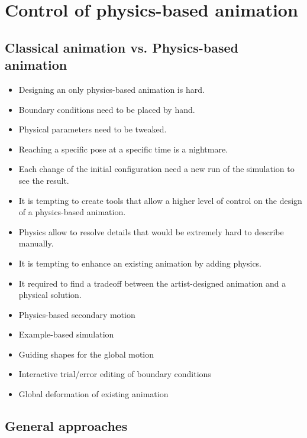 \section{Control of physics-based animation}

\subsection{Classical animation vs. Physics-based animation}

\begin{itemize}
\item Designing an only physics-based animation is hard.
\item Boundary conditions need to be placed by hand.
\item Physical parameters need to be tweaked.
\item Reaching a specific pose at a specific time is a nightmare.
\item Each change of the initial configuration need a new run of the simulation to see the result.
\item It is tempting to create tools that allow a higher level of control on the design of a physics-based animation.
\end{itemize}

\begin{itemize}
\item Physics allow to resolve details that would be extremely hard to describe manually.
\item It is tempting to enhance an existing animation by adding physics.
\item It required to find a tradeoff between the artist-designed animation and a physical solution.
\end{itemize}

\begin{itemize}
\item Physics-based secondary motion
\item Example-based simulation
\item Guiding shapes for the global motion
\item Interactive trial/error editing of boundary conditions
\item Global deformation of existing animation
\end{itemize}

\subsection{General approaches}


